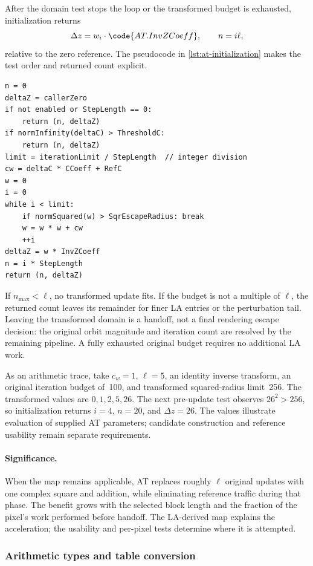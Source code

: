 After the domain test stops the loop or the transformed budget is
exhausted, initialization returns
\[
\Delta z=w_i\cdot\code{AT.InvZCoeff},\qquad n=i\ell,
\]
relative to the zero reference. The pseudocode in
\cref{lst:at-initialization} makes the test order and returned count explicit.

\begin{lstlisting}[float=htbp,caption={AT pixel initialization},label={lst:at-initialization}]
n = 0
deltaZ = callerZero
if not enabled or StepLength == 0:
    return (n, deltaZ)
if normInfinity(deltaC) > ThresholdC:
    return (n, deltaZ)
limit = iterationLimit / StepLength  // integer division
cw = deltaC * CCoeff + RefC
w = 0
i = 0
while i < limit:
    if normSquared(w) > SqrEscapeRadius: break
    w = w * w + cw
    ++i
deltaZ = w * InvZCoeff
n = i * StepLength
return (n, deltaZ)
\end{lstlisting}

If $n_{\max}<\ell$, no transformed update fits. If the budget is not
a multiple of $\ell$, the returned count leaves its remainder for
finer LA entries or the perturbation tail. Leaving the transformed
domain is a handoff, not a final rendering escape decision: the
original orbit magnitude and iteration count are resolved by the
remaining pipeline. A fully exhausted original budget requires no
additional LA work.

As an arithmetic trace, take $c_w=1$, $\ell=5$, an identity inverse
transform, an original iteration budget of~100, and transformed
squared-radius limit~256. The transformed
values are $0,1,2,5,26$. The next pre-update test observes
$26^2>256$, so initialization returns $i=4$, $n=20$, and
$\Delta z=26$. The values illustrate evaluation of supplied AT
parameters; candidate construction and reference usability remain
separate requirements.

\paragraph{Significance.}
When the map remains applicable, AT replaces roughly $\ell$ original
updates with one complex square and addition, while eliminating
reference traffic during that phase. The benefit grows with the
selected block length and the fraction of the pixel's work performed
before handoff. The LA-derived map explains the acceleration; the
usability and per-pixel tests determine where it is attempted.

\subsubsection{Arithmetic types and table conversion}
\label{sec:la-dp-conversion}


